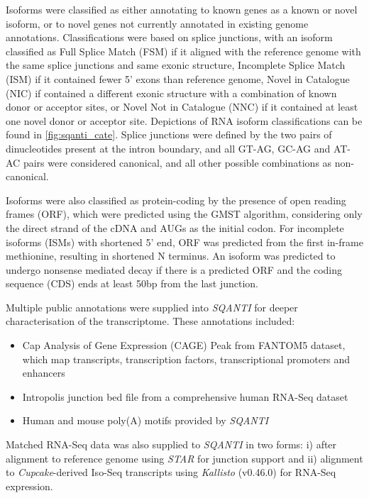 Isoforms were classified as either annotating to known genes as a known or novel isoform, or to novel genes not currently annotated in existing genome annotations. Classifications were based on splice junctions, with an isoform classified as Full Splice Match (FSM) if it aligned with the reference genome with the same splice junctions and same exonic structure, Incomplete Splice Match (ISM) if it contained fewer 5’ exons than reference genome, Novel in Catalogue (NIC) if contained a different exonic structure with a combination of known donor or acceptor sites, or Novel Not in Catalogue (NNC) if it contained at least one novel donor or acceptor site. Depictions of RNA isoform classifications can be found in \cref{fig:sqanti_cate}. Splice junctions were defined by the two pairs of dinucleotides present at the intron boundary, and all GT-AG, GC-AG and AT-AC pairs were considered canonical, and all other possible combinations as non-canonical. 

Isoforms were also classified as protein-coding by the presence of open reading frames (ORF), which were predicted using the GMST algorithm, considering only the direct strand of the cDNA and AUGs as the initial codon. For incomplete isoforms (ISMs) with shortened 5' end, ORF was predicted from the first in-frame methionine, resulting in shortened N terminus. An isoform was predicted to undergo nonsense mediated decay if there is a predicted ORF and the coding sequence (CDS) ends at least 50bp from the last junction. 

Multiple public annotations were supplied into \textit{SQANTI} for deeper characterisation of the transcriptome. These annotations included:
\begin{itemize}
	\item Cap Analysis of Gene Expression (CAGE) Peak from FANTOM5 dataset, which map transcripts, transcription factors, transcriptional promoters and enhancers
	\item Intropolis junction bed file\cite{Nellore2016} from a comprehensive human RNA-Seq dataset
	\item Human and mouse poly(A) motifs provided by \textit{SQANTI}	 
\end{itemize}

Matched RNA-Seq data was also supplied to \textit{SQANTI} in two forms: i) after alignment to reference genome using \textit{STAR} for junction support and ii) alignment to \textit{Cupcake}-derived Iso-Seq transcripts using \textit{Kallisto} (v0.46.0)\cite{Bray2016} for RNA-Seq expression.  

